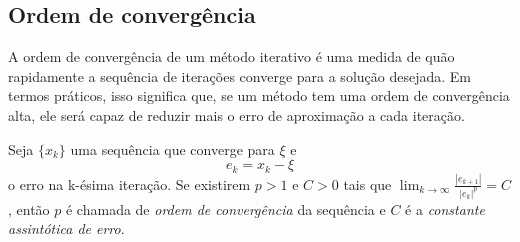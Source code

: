 
\subsection{Ordem de convergência}

A ordem de convergência de um método iterativo é uma medida de quão rapidamente a sequência de iterações converge para a solução desejada. Em termos práticos, isso significa que, se um método tem uma ordem de convergência alta, ele será capaz de reduzir mais o erro de aproximação a cada iteração.
\begin{df}
    Seja $\{x_k\}$ uma sequência que converge para $\xi$ e
    \begin{equation} \label{erro}
        e_k = x_k - \xi
    \end{equation}
    o erro na k-ésima iteração.
    Se existirem $p > 1$ e $C > 0$ tais que $\lim_{k \to \infty} \frac{|e_{k+1}|}{|e_k|^p} = C$, então $p$ é chamada de \emph{ordem de convergência} da sequência e $C$ é a \emph{constante assintótica de erro}.
\end{df}

